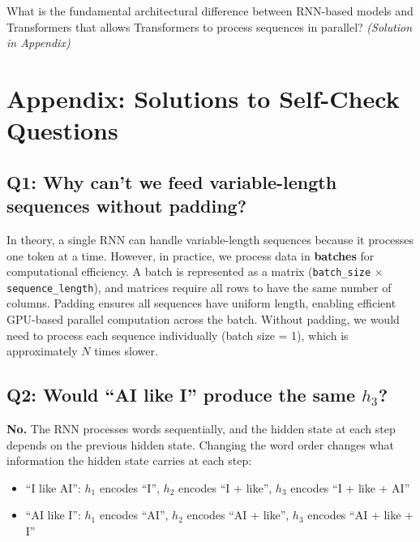 \documentclass[11pt,a4paper]{article}
\begin{document}
\begin{tcolorbox}[questionbox={Self-Check Q7}]
What is the fundamental architectural difference between RNN-based models and Transformers that allows Transformers to process sequences in parallel? \textit{(Solution in Appendix)}
\end{tcolorbox}

\newpage
\section*{Appendix: Solutions to Self-Check Questions}

\subsection*{Q1: Why can't we feed variable-length sequences without padding?}

In theory, a single RNN can handle variable-length sequences because it processes one token at a time. However, in practice, we process data in \textbf{batches} for computational efficiency. A batch is represented as a matrix (\texttt{batch\_size} $\times$ \texttt{sequence\_length}), and matrices require all rows to have the same number of columns. Padding ensures all sequences have uniform length, enabling efficient GPU-based parallel computation across the batch. Without padding, we would need to process each sequence individually (batch size = 1), which is approximately $N$ times slower.

\subsection*{Q2: Would ``AI like I'' produce the same $h_3$?}

\textbf{No.} The RNN processes words sequentially, and the hidden state at each step depends on the previous hidden state. Changing the word order changes what information the hidden state carries at each step:

\begin{itemize}[leftmargin=1.5em]
    \item ``I like AI'': $h_1$ encodes ``I'', $h_2$ encodes ``I + like'', $h_3$ encodes ``I + like + AI''
    \item ``AI like I'': $h_1$ encodes ``AI'', $h_2$ encodes ``AI + like'', $h_3$ encodes ``AI + like + I''
\end{itemize}
\end{document}
